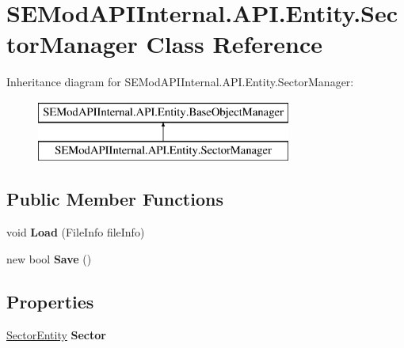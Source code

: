 \hypertarget{class_s_e_mod_a_p_i_internal_1_1_a_p_i_1_1_entity_1_1_sector_manager}{}\section{S\+E\+Mod\+A\+P\+I\+Internal.\+A\+P\+I.\+Entity.\+Sector\+Manager Class Reference}
\label{class_s_e_mod_a_p_i_internal_1_1_a_p_i_1_1_entity_1_1_sector_manager}
Inheritance diagram for S\+E\+Mod\+A\+P\+I\+Internal.\+A\+P\+I.\+Entity.\+Sector\+Manager\+:\begin{figure}[H]
\begin{center}
\leavevmode
\includegraphics[height=2.000000cm]{class_s_e_mod_a_p_i_internal_1_1_a_p_i_1_1_entity_1_1_sector_manager}
\end{center}
\end{figure}
\subsection*{Public Member Functions}
\begin{DoxyCompactItemize}
\item 
\hypertarget{class_s_e_mod_a_p_i_internal_1_1_a_p_i_1_1_entity_1_1_sector_manager_a3c29652670fcc15dd83bf0bb0cc3260b}{}void {\bfseries Load} (File\+Info file\+Info)\label{class_s_e_mod_a_p_i_internal_1_1_a_p_i_1_1_entity_1_1_sector_manager_a3c29652670fcc15dd83bf0bb0cc3260b}

\item 
\hypertarget{class_s_e_mod_a_p_i_internal_1_1_a_p_i_1_1_entity_1_1_sector_manager_a9f3e7996c7534907c403780d1598d6a2}{}new bool {\bfseries Save} ()\label{class_s_e_mod_a_p_i_internal_1_1_a_p_i_1_1_entity_1_1_sector_manager_a9f3e7996c7534907c403780d1598d6a2}

\end{DoxyCompactItemize}
\subsection*{Properties}
\begin{DoxyCompactItemize}
\item 
\hypertarget{class_s_e_mod_a_p_i_internal_1_1_a_p_i_1_1_entity_1_1_sector_manager_aa0363ac93ea203307773fe124dc3298f}{}\hyperlink{class_s_e_mod_a_p_i_internal_1_1_a_p_i_1_1_entity_1_1_sector_entity}{Sector\+Entity} {\bfseries Sector}\label{class_s_e_mod_a_p_i_internal_1_1_a_p_i_1_1_entity_1_1_sector_manager_aa0363ac93ea203307773fe124dc3298f}

\end{DoxyCompactItemize}
